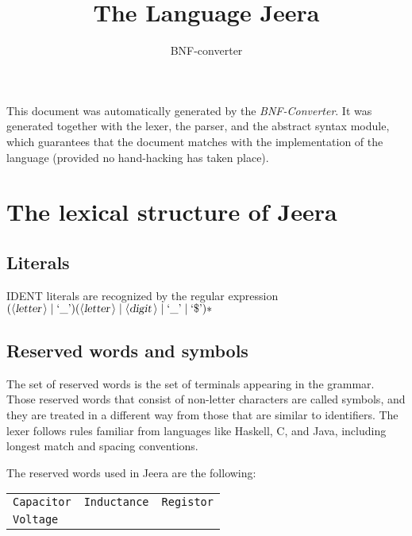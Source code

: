 \documentclass[a4paper,11pt]{article}
\author{BNF-converter}
\title{The Language Jeera}
\begin{document}
\maketitle

\newcommand{\emptyP}{\mbox{$\epsilon$}}
\newcommand{\terminal}[1]{\mbox{{\texttt {#1}}}}
\newcommand{\nonterminal}[1]{\mbox{$\langle \mbox{{\sl #1 }} \! \rangle$}}
\newcommand{\arrow}{\mbox{::=}}
\newcommand{\delimit}{\mbox{$|$}}
\newcommand{\reserved}[1]{\mbox{{\texttt {#1}}}}
\newcommand{\literal}[1]{\mbox{{\texttt {#1}}}}
\newcommand{\symb}[1]{\mbox{{\texttt {#1}}}}

This document was automatically generated by the {\em BNF-Converter}. It was generated together with the lexer, the parser, and the abstract syntax module, which guarantees that the document matches with the implementation of the language (provided no hand-hacking has taken place).

\section*{The lexical structure of Jeera}

\subsection*{Literals}


IDENT literals are recognized by the regular expression
\(({\nonterminal{letter}} \mid \mbox{`\_'}) ({\nonterminal{letter}} \mid {\nonterminal{digit}} \mid \mbox{`\_'} \mid \mbox{`\$'})*\)


\subsection*{Reserved words and symbols}
The set of reserved words is the set of terminals appearing in the grammar. Those reserved words that consist of non-letter characters are called symbols, and they are treated in a different way from those that are similar to identifiers. The lexer follows rules familiar from languages like Haskell, C, and Java, including longest match and spacing conventions.

The reserved words used in Jeera are the following: \\

\begin{tabular}{lll}
{\reserved{Capacitor}} &{\reserved{Inductance}} &{\reserved{Registor}} \\
{\reserved{Voltage}} & & \\
\end{tabular}\\
\end{document}
